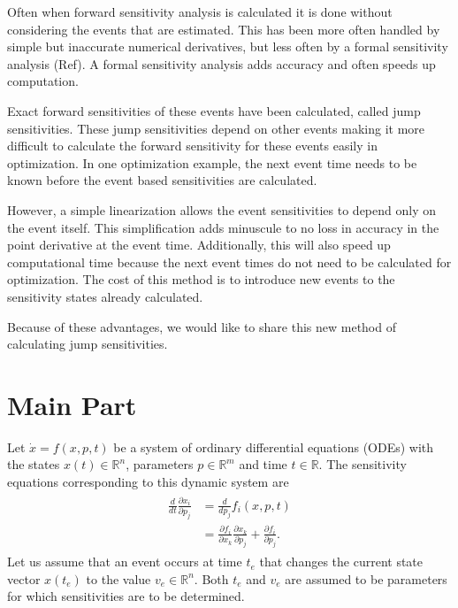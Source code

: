 \documentclass[journal, a4paper]{IEEEtran}
\begin{document}
	Often when forward sensitivity analysis is calculated it is done without
	considering the events that are estimated.  This has been more often  handled by
	simple but inaccurate numerical derivatives, but less often by a formal
	sensitivity analysis (Ref).  A formal sensitivity analysis adds accuracy and often speeds up computation.
	
	Exact forward sensitivities of these events have been calculated, called jump sensitivities. These jump sensitivities depend on other events making it more difficult to calculate the forward sensitivity for these events easily in optimization.  In one optimization example, the next event time needs to be known before the event based sensitivities are calculated.
	
	However, a simple linearization allows the event sensitivities to depend only on the event itself.  This simplification adds minuscule to no loss in accuracy in the point derivative at the event time.  Additionally, this will also speed up computational time because the next event times do not need to be calculated for optimization.  The cost of this method is to introduce new events to the sensitivity states already calculated.
	
	Because of these advantages, we would like to share this new method of calculating jump sensitivities.
	

\section{Main Part}
\label{sec:main}
Let $\dot x = f(x, p, t)$ be a system of ordinary differential equations (ODEs) with the states $x(t) \in \mathbb R^n$, parameters $p \in \mathbb R^m$ and time $t \in \mathbb R$. The sensitivity equations corresponding to this dynamic system are
\begin{align}
\begin{aligned}
    \frac{d}{dt}\frac{\partial x_i}{\partial p_j} &= \frac{d}{dp_j} f_i(x, p, t)\\
        & = \frac{\partial f_i}{\partial x_k}\frac{\partial x_k}{\partial p_j} + 
            \frac{\partial f_i}{\partial p_j}.
\end{aligned}
 \label{eq:sens}
\end{align}
Let us assume that an event occurs at time $t_e$ that changes the current state vector $x(t_e)$ to the value $v_e \in \mathbb R^n$. Both $t_e$ and $v_e$ are assumed to be parameters for which sensitivities are to be determined.
\end{document}
